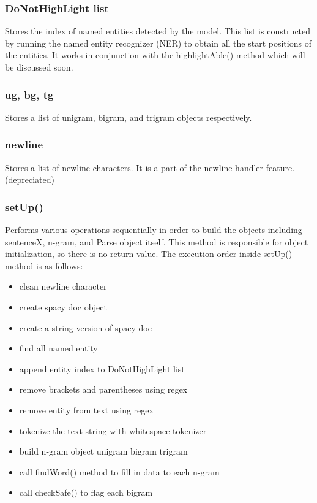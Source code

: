 \documentclass[12pt,oneside,openright,a4paper]{cpe-english-project}
\begin{document}
\subsubsection{DoNotHighLight list }
Stores the index of named entities detected by the model. This list is constructed by running the named entity recognizer (NER) to obtain all the start positions of the entities. It works in conjunction with the highlightAble() method which will be discussed soon.

\subsubsection{ ug, bg, tg}
Stores a list of unigram, bigram, and trigram objects respectively.

\subsubsection{newline}
Stores a list of newline characters. It is a part of the newline handler feature. (depreciated)

\subsubsection { setUp()} 
Performs various operations sequentially in order to build the objects including sentenceX, n-gram, and Parse object itself. This method is responsible for object initialization, so there is no return value. The execution order inside setUp() method is as follows:

\begin{itemize}
\item clean newline character
\item create spacy doc object
\item create a string version of spacy doc
\item find all named entity
\item append entity index to DoNotHighLight list
\item remove brackets and parentheses using regex
\item remove entity from text using regex
\item tokenize the text string with whitespace tokenizer
\item build n-gram object unigram bigram trigram
\item call findWord() method to fill in data to each n-gram
\item call checkSafe() to flag each bigram 
\end{itemize}
\end{document}
